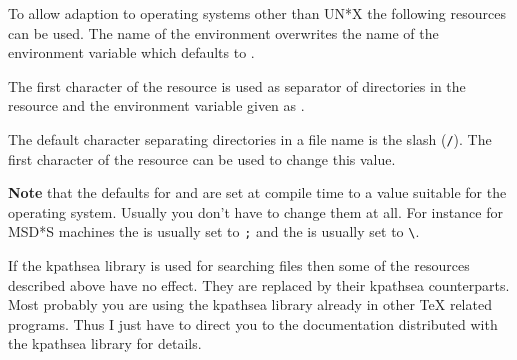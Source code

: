 \documentclass[11pt,a4paper]{scrbook}
\begin{document}
To allow adaption to operating systems other than UN*X the following resources
can be used. The name of the environment  overwrites the
name of the environment variable which defaults to .

\begin{Resources}
\end{Resources}

The first character of the resource  is used as separator
of directories in the resource  and the environment
variable given as .

\begin{Resources}
\end{Resources}

The default character separating directories in a file name is the slash
(\verb|/|).  The first character of the resource  can
be used to change this value.

\begin{Resources}
\end{Resources}

\textbf{Note} that the defaults for  and
 are set at compile time to a value suitable for the
operating system. Usually you don't have to change them at all. For instance
for MSD*S machines the  is usually set to \verb|;| and the
 is usually set to \verb|\|.

If the kpathsea library is used for searching \BibTeX{} files then some of the
resources described above have no effect. They are replaced by their kpathsea
counterparts. Most probably you are using the kpathsea library already in
other \TeX{} related programs. Thus I just have to direct you to the
documentation distributed with the kpathsea library for details.

\begin{Summary}
\end{Summary}
\end{document}
